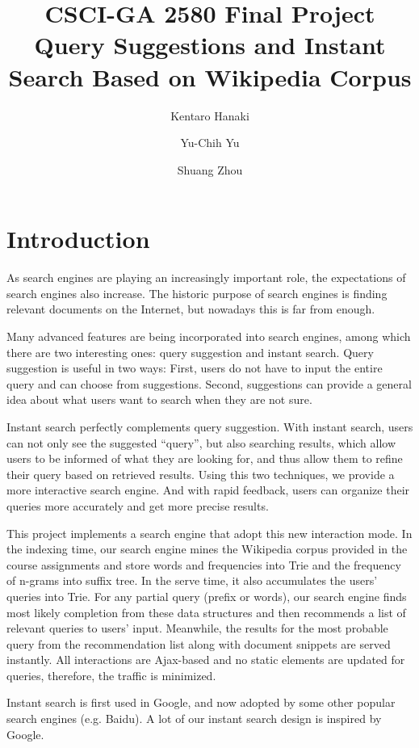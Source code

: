 \documentclass{article}
\title{CSCI-GA 2580 Final Project\\
Query Suggestions and Instant Search Based on Wikipedia Corpus}
\author{Kentaro Hanaki \and Yu-Chih Yu \and Shuang Zhou}
\begin{document}
\maketitle

\section{Introduction}
As search engines are playing an increasingly important role, the expectations of search engines also increase. The historic purpose of search engines is finding relevant documents on the Internet, but nowadays this is far from enough.

Many advanced features are being incorporated into search engines, among which there are two interesting ones: query suggestion and instant search. Query suggestion is useful in two ways: First, users do not have to input the entire query and can choose from suggestions. Second, suggestions can provide a general idea about what users want to search when they are not sure.

Instant search perfectly complements query suggestion. With instant search, users can not only see the suggested ``query'', but also searching results, which allow users to be informed of what they are looking for, and thus allow them to refine their query based on retrieved results. Using this two techniques, we provide a more interactive search engine. And with rapid feedback, users can organize their queries more accurately and get more precise results.

This project implements a search engine that adopt this new interaction mode. In the indexing time, our search engine mines the Wikipedia corpus provided in the course assignments and store words and frequencies into Trie and the frequency of n-grams into suffix tree. In the serve time, it also accumulates the users' queries into Trie. For any partial query (prefix or words), our search engine finds most likely completion from these data structures and then recommends a list of relevant queries to users' input.
Meanwhile, the results for the most probable query from the recommendation list along with document snippets are served instantly. All interactions are Ajax-based and no static elements are updated for queries, therefore, the traffic is minimized.

Instant search is first used in Google, and now adopted by some other popular search engines (e.g. Baidu). A lot of our instant search design is inspired by Google.
\end{document}
